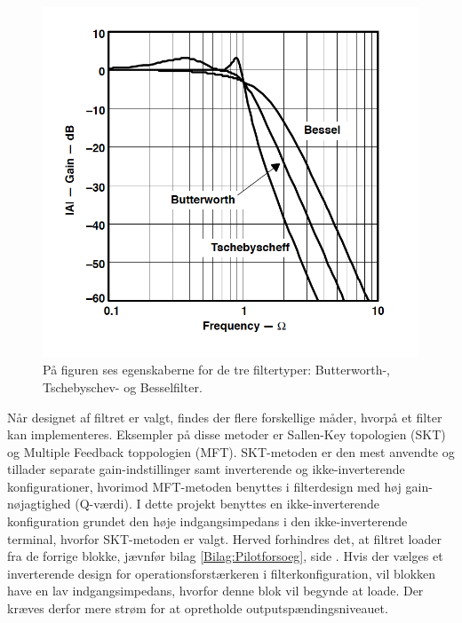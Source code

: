 \begin{figure}[H]
	\centering
	\includegraphics[scale=0.7]{figures/cProblemloesning/type_filtre.PNG}
	\caption{På figuren ses egenskaberne for de tre filtertyper: Butterworth-, Tschebyschev- og Besselfilter. \cite{Carter2013}}
	\label{fig:type_filtre}
\end{figure}
\noindent Når designet af filtret er valgt, findes der flere forskellige måder, hvorpå et filter kan implementeres. Eksempler på disse metoder er Sallen-Key topologien (SKT) og Multiple Feedback toppologien (MFT). SKT-metoden er den mest anvendte og tillader separate gain-indstillinger samt inverterende og ikke-inverterende konfigurationer, hvorimod MFT-metoden benyttes i filterdesign med høj gain-nøjagtighed (Q-værdi). I dette projekt benyttes en ikke-inverterende konfiguration grundet den høje indgangsimpedans i den ikke-inverterende terminal, hvorfor SKT-metoden er valgt. Herved forhindres det, at filtret loader fra de forrige blokke, jævnfør bilag \ref{Bilag:Pilotforsoeg}, side \pageref{Bilag:Pilotforsoeg}. Hvis der vælges et inverterende design for operationsforstærkeren i filterkonfiguration, vil blokken have en lav indgangsimpedans, hvorfor denne blok vil begynde at loade. Der kræves derfor mere strøm for at opretholde outputspændingsniveauet. \cite{webster2009,Carter2013,karni2014}

